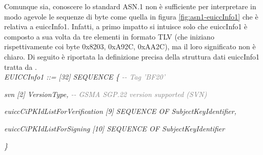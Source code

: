 \documentclass[10pt, oneside]{book}
\begin{document}
Comunque sia, conoscere lo standard ASN.1 non è sufficiente per interpretare in modo agevole le sequenze di byte come quella in figura \ref{fig:asn1-euiccInfo1} che è relativa a euiccInfo1. Infatti, a primo impatto si intuisce solo che euiccInfo1 è composto a sua volta da tre elementi in formato TLV (che iniziano rispettivamente coi byte 0x8203, 0xA92C, 0xAA2C), ma il loro significato non è chiaro. Di seguito è riportata la definizione precisa della struttura dati euiccInfo1 tratta da \cite{RSP-definitions}.\\

\textit{EUICCInfo1 ::= [32] SEQUENCE \{ \textcolor{gray}{{-}{-} Tag 'BF20'}}

\hspace{0.75cm} \textit{svn [2] VersionType, \textcolor{gray}{{-}{-} GSMA SGP.22 version supported (SVN)}}

\hspace{0.75cm} \textit{euiccCiPKIdListForVerification [9] SEQUENCE OF SubjectKeyIdentifier,}

\hspace{0.75cm} \textit{euiccCiPKIdListForSigning [10] SEQUENCE OF SubjectKeyIdentifier}

\textit{\}\\}
\end{document}

